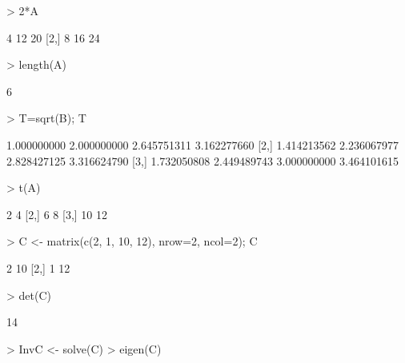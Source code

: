 \documentclass{article}
\begin{document}
\begin{Schunk}
\begin{Sinput}
> 2*A
\end{Sinput}
\begin{Soutput}
     [,1] [,2] [,3]
[1,]    4   12   20
[2,]    8   16   24
\end{Soutput}
\begin{Sinput}
> length(A)
\end{Sinput}
\begin{Soutput}
[1] 6
\end{Soutput}
\begin{Sinput}
> T=sqrt(B); T
\end{Sinput}
\begin{Soutput}
            [,1]        [,2]        [,3]        [,4]
[1,] 1.000000000 2.000000000 2.645751311 3.162277660
[2,] 1.414213562 2.236067977 2.828427125 3.316624790
[3,] 1.732050808 2.449489743 3.000000000 3.464101615
\end{Soutput}
\begin{Sinput}
> t(A)
\end{Sinput}
\begin{Soutput}
     [,1] [,2]
[1,]    2    4
[2,]    6    8
[3,]   10   12
\end{Soutput}
\begin{Sinput}
> C <- matrix(c(2, 1, 10, 12), nrow=2, ncol=2); C
\end{Sinput}
\begin{Soutput}
     [,1] [,2]
[1,]    2   10
[2,]    1   12
\end{Soutput}
\begin{Sinput}
> det(C)
\end{Sinput}
\begin{Soutput}
[1] 14
\end{Soutput}
\begin{Sinput}
> InvC <- solve(C)
> eigen(C)
\end{Sinput}
\end{Schunk}
\end{document}
